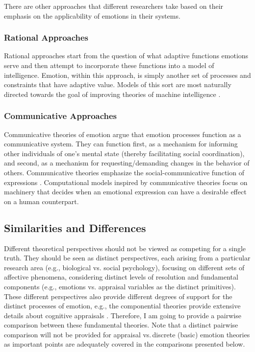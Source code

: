 \documentclass[12pt]{report}
\begin{document}

There are other approaches that different researchers take based on their
emphasis on the applicability of emotions in their systems.

\subsubsection{Rational Approaches}

Rational approaches start from the question of what adaptive functions emotions
serve and then attempt to incorporate these functions into a model of
intelligence. Emotion, within this approach, is simply another set of processes
and constraints that have adaptive value. Models of this sort are most naturally
directed towards the goal of improving theories of machine intelligence
\cite{anderson:newell-cognition} \cite{scheutz:affect-agent}
\cite{simon:motivation-emotion-cognition}.

\subsubsection{Communicative Approaches}

Communicative theories of emotion argue that emotion processes function as a
communicative system. They can function first, as a mechanism for informing
other individuals of one’s mental state (thereby facilitating social
coordination), and second, as a mechanism for requesting/demanding changes in
the behavior of others. Communicative theories emphasize the
social-communicative function of expressions \cite{gratch:emotion-intention}.
Computational models inspired by communicative theories focus on machinery that
decides when an emotional expression can have a desirable effect on a human
counterpart.

\subsection{Similarities and Differences}
\label{sec:comparison}

Different theoretical perspectives should not be viewed as competing for a
single truth. They should be seen as distinct perspectives, each arising from a
particular research area (e.g., biological vs. social psychology), focusing on
different sets of affective phenomena, considering distinct levels of resolution
and fundamental components (e.g., emotions vs. appraisal variables as the
distinct primitives). These different perspectives also provide different
degrees of support for the distinct processes of emotion, e.g., the componential
theories provide extensive details about cognitive appraisals
\cite{hudlicka:guidelines-emotions}. Therefore, I am going to provide a pairwise
comparison between these fundamental theories. Note that a distinct pairwise
comparison will not be provided for appraisal vs.\,discrete (basic) emotion
theories as important points are adequately covered in the comparisons presented
below.
\end{document}
